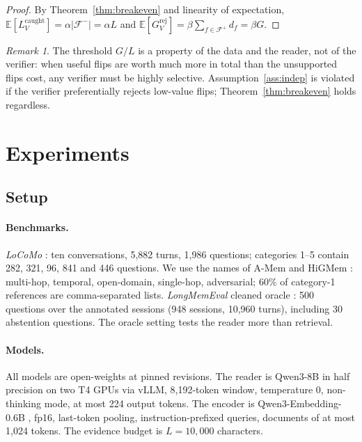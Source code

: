 \documentclass[10pt]{article}
\theoremstyle{plain}
\theoremstyle{definition}
\theoremstyle{remark}
\newtheorem{remark}{Remark}
\newcommand{\F}{\mathcal{F}}
\begin{document}
\begin{proof}
By Theorem~\ref{thm:breakeven} and linearity of expectation,
$\mathbb{E}[L_V^{\mathrm{caught}}]=\alpha|\F^-|=\alpha L$ and
$\mathbb{E}[G_V^{\mathrm{rej}}]=\beta\sum_{f\in\F^+}d_f=\beta G$.
\end{proof}

\begin{remark}
The threshold $G/L$ is a property of the data and the reader, not of the verifier:
when useful flips are worth much more in total than the unsupported flips cost,
any verifier must be highly selective. Assumption~\ref{ass:indep} is violated if the verifier
preferentially rejects low-value flips; Theorem~\ref{thm:breakeven} holds regardless.
\end{remark}

\section{Experiments}
\label{sec:experiments}

\subsection{Setup}

\paragraph{Benchmarks.}
\emph{LoCoMo} \citep{maharana2024locomo}: ten conversations, 5,882 turns, 1,986
questions; categories 1--5 contain 282, 321, 96, 841 and 446 questions. We use the
names of A-Mem and HiGMem \citep{amem2025,cao2026higmem}: multi-hop, temporal,
open-domain, single-hop, adversarial; 60\% of category-1 references are
comma-separated lists. \emph{LongMemEval} cleaned oracle \citep{wu2024longmemeval}:
500 questions over the annotated sessions (948 sessions, 10,960 turns), including
30 abstention questions. The oracle setting tests the reader more than retrieval.

\paragraph{Models.}
All models are open-weights at pinned revisions. The reader is Qwen3-8B
\citep{yang2025qwen3} in half precision on two T4 GPUs via vLLM, 8,192-token
window, temperature 0, non-thinking mode, at most 224 output tokens. The encoder is
Qwen3-Embedding-0.6B \citep{zhang2025qwen3embedding}, fp16, last-token pooling,
instruction-prefixed queries, documents of at most 1,024 tokens. The evidence
budget is $L=10{,}000$ characters.
\end{document}
